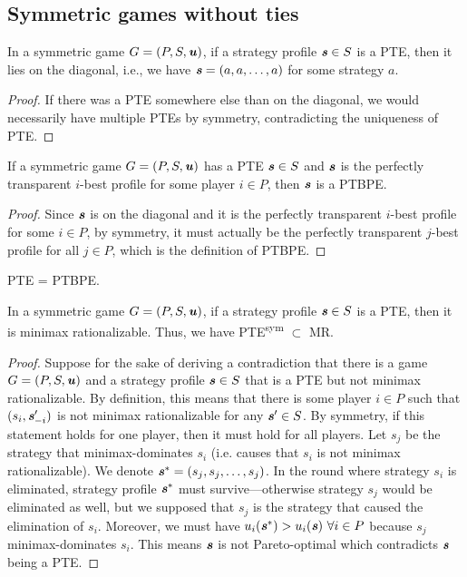 \subsection{Symmetric games without ties}

\begin{observation}
	 In a symmetric game $G = (P, S, \boldsymbol{\mathit{u}})$, if a strategy profile $\boldsymbol{\mathit{s}} \in S$ is a PTE, then it lies on the diagonal, i.e., we have $\boldsymbol{\mathit{s}} = (a, a, \dots, a)$ for some strategy $a$.
\end{observation}

\begin{proof}
	If there was a PTE somewhere else than on the diagonal, we would necessarily have multiple PTEs by symmetry, contradicting the uniqueness of PTE.
\end{proof}

\begin{corollary}
	If a symmetric game $G = (P, S, \boldsymbol{\mathit{u}})$ has a PTE $\boldsymbol{\mathit{s}} \in S$ and $\boldsymbol{\mathit{s}}$ is the perfectly transparent $i$-best profile for some player $i \in P$, then $\boldsymbol{\mathit{s}}$ is a PTBPE. 
\end{corollary}

\begin{proof}
	Since $\boldsymbol{\mathit{s}}$ is on the diagonal and it is the perfectly transparent $i$-best profile for some $i \in P$, by symmetry, it must actually be the perfectly transparent $j$-best profile for all $j \in P$, which is the definition of PTBPE.
\end{proof}

\begin{conjecture}
	PTE = PTBPE.
\end{conjecture}

\begin{lemma}
	In a symmetric game $G = (P, S, \boldsymbol{\mathit{u}})$, if a strategy profile $\boldsymbol{\mathit{s}} \in S$ is a PTE, then it is minimax rationalizable.
	Thus, we have PTE\textsuperscript{sym} $\subset$ MR.
\end{lemma}

\begin{proof}
	Suppose for the sake of deriving a contradiction that there is a game $G = (P, S, \boldsymbol{\mathit{u}})$ and a strategy profile $\boldsymbol{\mathit{s}} \in S$ that is a PTE but not minimax rationalizable.
	By definition, this means that there is some player $i \in P$ such that $(s_i, \boldsymbol{\mathit{s}}_{-i}')$ is not minimax rationalizable for any $\boldsymbol{\mathit{s}}' \in S$.
	By symmetry, if this statement holds for one player, then it must hold for all players.
	Let $s_j$ be the strategy that minimax-dominates $s_i$ (i.e. causes that $s_i$ is not minimax rationalizable).
	We denote $\boldsymbol{\mathit{s}}^* = (s_j, s_j, \dots, s_j)$.
	In the round where strategy $s_i$ is eliminated, strategy profile $\boldsymbol{\mathit{s}}^*$ must survive---otherwise strategy $s_j$ would be eliminated as well, but we supposed that $s_j$ is the strategy that caused the elimination of $s_i$.
	Moreover, we must have $u_i(\boldsymbol{\mathit{s}}^*) > u_i(\boldsymbol{\mathit{s}})\ \forall i \in P$ because $s_j$ minimax-dominates $s_i$.
	This means $\boldsymbol{\mathit{s}}$ is not Pareto-optimal which contradicts $\boldsymbol{\mathit{s}}$ being a PTE.
\end{proof}

